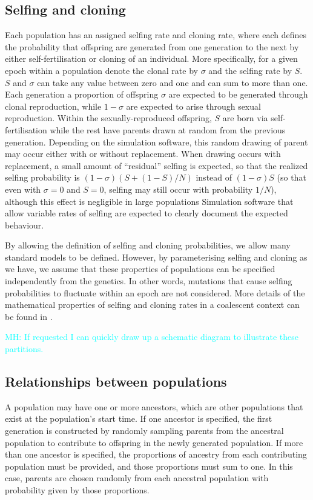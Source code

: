 \documentclass[11pt]{article}
\newcommand{\mhcomment}[1]{{\textcolor{cyan}{MH: #1}}}
\begin{document}
\subsection{Selfing and cloning}

Each population has an assigned selfing rate and cloning rate, where each defines
the probability that offspring are generated from one generation to the next by either
self-fertilisation or cloning of an individual.
More specifically, for a given epoch within a population denote the clonal rate by
$\sigma$ and the selfing rate by $S$.
$S$ and $\sigma$ can take any value between zero and one and
can sum to more than one.
Each generation a proportion of offspring
$\sigma$ are expected to be generated through clonal reproduction,
while $1-\sigma$ are expected to arise through sexual reproduction.
Within the sexually-reproduced offspring,
$S$ are born via self-fertilisation while the rest
have parents drawn at random from the previous generation.
Depending on the simulation software, this random drawing of parent may occur
either with or without replacement. When drawing occurs with replacement, a small
amount of ``residual'' selfing is expected, so that the realized selfing probability
is $(1-\sigma)(S + (1-S)/N)$ instead of $(1-\sigma)S$ (so that even with $\sigma=0$
and $S=0$, selfing may still occur with probability $1/N$), although
this effect is negligible in large populations \citep{nordborg1997coalescent}
Simulation software that allow variable rates of selfing are expected to clearly
document the expected behaviour.

By allowing the definition of selfing and cloning probabilities, we allow many 
standard models to be defined.
However, by parameterising selfing and cloning as we have, we assume that these
properties of populations can be specified independently from the genetics.
In other words, mutations that cause selfing probabilities to fluctuate within
an epoch are not considered.
More details of the mathematical properties of selfing and cloning rates
in a coalescent context can be found in \citet{hartfield2016facsexcoal}.

\mhcomment{If requested
I can quickly draw up a schematic diagram to illustrate these partitions.}

\subsection{Relationships between populations}

A population may have one
or more ancestors, which are other populations that exist at the population's
start time. If one ancestor is specified, the first generation is constructed
by randomly sampling parents from the ancestral population to contribute to
offspring in the newly generated population. If more than one ancestor is
specified, the proportions of ancestry from each contributing population must
be provided, and those proportions must sum to one. In this case, parents are
chosen randomly from each ancestral population with probability given by those
proportions.
\end{document}
